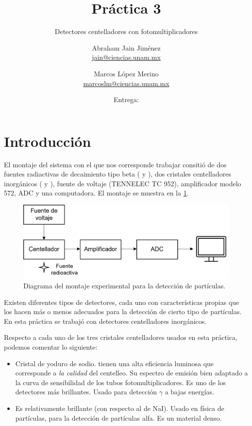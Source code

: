 \documentclass[12pt]{article}
\title{Práctica 3}
\subtitle{Detectores centelladores con fotomultiplicadores}
\author{%
    Abraham Jain Jiménez \\ \href{mailto:jain@ciencias.unam.mx}{\footnotesize jain@ciencias.unam.mx}
  \and Marcos López Merino \\ \href{mailto:marcoslm@ciencias.unam.mx}{\footnotesize marcoslm@ciencias.unam.mx}
}%
\date{Entrega: \DTMusedate{duedate}}
\begin{document}
    \maketitle
    \thispagestyle{fancy}
    \begin{abstract}
        \kant[1]
    \end{abstract}

    \section*{Introducción}
        El montaje del sistema con el que nos corresponde trabajar consitió de dos fuentes radiactivas de decaimiento tipo beta ( y ), dos cristales centelladores inorgánicos ( y ), fuente de voltaje (TENNELEC TC 952), amplificador modelo 572\cite{Amplifier572}, ADC\cite{USC30ADC} y una computadora. El montaje se muestra en la \cref{fig:montaje}.

        \begin{figure}[htb]
            \centering
            \includegraphics{montaje.png}
            \caption{Diagrama del montaje experimental para la detección de partículas.}
            \label{fig:montaje}
        \end{figure}

        Existen diferentes tipos de detectores, cada uno con características propias que los hacen más o menos adecuados para la detección de cierto tipo de partículas. En esta práctica se trabajó con detectores centelladores inorgánicos.

        Respecto a cada uno de los tres cristales centelladores usados en esta práctica, podemos comentar lo siguiente:

        \begin{itemize}
            \item {}

            Cristal de yoduro de sodio. tienen una alta eficiencia luminosa que corresponde a \emph{la calidad} del centelleo. Su espectro de emisión bien adaptado a la curva de sensibilidad de los tubos fotomultiplicadores. Es uno de los detectores más brillantes. Usado para detección $\gamma$ a bajas energías.

            \item {}

            Es relativamente brillante (con respecto al de NaI). Usado en física de partículas, para la detección de partículas alfa. Es un material denso. 
        \end{itemize}
\end{document}
